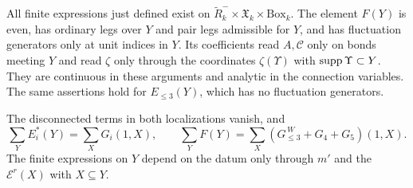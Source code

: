 \begin{proposition}\label{prop:rgnl-finite-locality}
All finite expressions just defined exist on
$\widetilde R_k^-\times\mathfrak X_k\times\mathrm{Box}_k$.
The element $F(Y)$ is even, has ordinary legs over $Y$ and
pair legs admissible for $Y$, and has fluctuation generators
only at unit indices in $Y$. Its coefficients read $A,\mathscr C$
only on bonds meeting $Y$ and read $\zeta$ only through the
coordinates $\zeta(\Upsilon)$ with $\operatorname{supp}\Upsilon\subset Y$.
They are continuous in these arguments and analytic in the
connection variables. The same assertions hold for $E_{\le3}(Y)$,
which has no fluctuation generators.

The disconnected terms in both localizations vanish, and
\begin{equation}\label{eq:rgnl-two-localization-sums}
 \sum_YE_i^*(Y)=\sum_XG_i(1,X),\qquad
 \sum_YF(Y)=\sum_X(G_{\le3}^{\,W}+G_4+G_5)(1,X).
\end{equation}
The finite expressions on $Y$ depend on the datum only through
$m'$ and the $\mathscr E^r(X)$ with $X\subseteq Y$.
\end{proposition}

